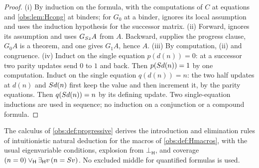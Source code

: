 \begin{proof}
(i) By induction on the formula, with the computations of $C$ at equations and
\cref{obs:lem:Hcong} at binders; for $G_0$ at a binder,  ignores
its local assumption and uses the induction hypothesis for the successor
matrix. (ii) Forward,  ignores its assumption and uses
$G_{S z}A$ from $A$. Backward,  supplies the progress clause,
$G_0A$ is a theorem, and one  gives $G_1A$, hence $A$. (iii) By
computation, (ii) and congruence. (iv) Induct on the single equation
$p(d(n))=0$: at a successor two parity updates send $0$ to $1$ and back. Then
$p(S d(n))=1$ by one computation. Induct on the single equation
$q(d(n))=n$: the two half updates at $d(n)$ and $S d(n)$ first keep the
value and then increment it, by the parity equations. Then
$q(S d(n))=n$ by its defining update. Two single-equation inductions are
used in sequence; no induction on a conjunction or a compound formula.
\end{proof}

\begin{proposition}
\label{obs:prop:Hlogic}
The calculus of \cref{obs:def:progressive} derives the introduction and
elimination rules of intuitionistic natural deduction for the macros of
\cref{obs:def:Hmacros}, with the usual eigenvariable conditions, explosion from
$\bot_{\mathsf{H}}$, and coverage
$(n=0)\vee_{\mathsf{H}}\exists_{\mathsf{H}}v\,(n=S v)$. No excluded middle
for quantified formulas is used.
\end{proposition}

